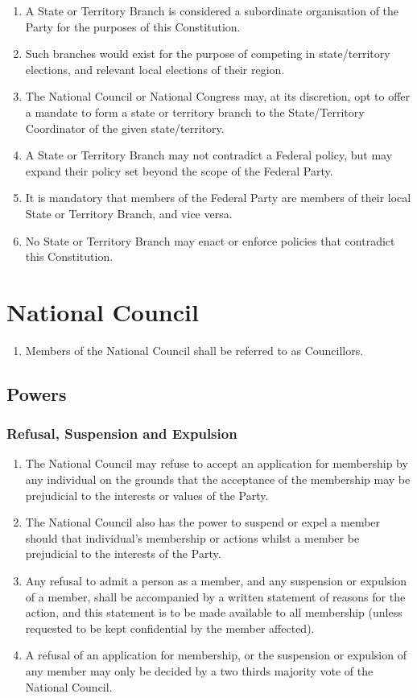 \documentclass[a4paper,titlepage,8.5pt]{article}
\begin{document}
\begin{enumerate}
\item A State or Territory Branch is considered a subordinate organisation of the Party for the purposes of this Constitution.
\item Such branches would exist for the purpose of competing in state/territory elections, and relevant local elections of their region.
\item The National Council or National Congress may, at its discretion, opt to offer a mandate to form a state or territory branch to the State/Territory Coordinator of the given state/territory.
\item A State or Territory Branch may not contradict a Federal policy, but may expand their policy set beyond the scope of the Federal Party.
\item It is mandatory that members of the Federal Party are members of their local State or Territory Branch, and vice versa.
\item No State or Territory Branch may enact or enforce policies that contradict this Constitution.
\end{enumerate}

\section{National Council}

\begin{enumerate}
\item Members of the National Council shall be referred to as Councillors.
\end{enumerate}

\subsection{Powers}

\subsubsection{Refusal, Suspension and Expulsion}

\begin{enumerate}
\item The National Council may refuse to accept an application for membership by any individual on the grounds that the acceptance of the membership may be prejudicial to the interests or values of the Party.
\item The National Council also has the power to suspend or expel a member should that individual’s membership or actions whilst a member be prejudicial to the interests of the Party.
\item Any refusal to admit a person as a member, and any suspension or expulsion of a member, shall be accompanied by a written statement of reasons for the action, and this statement is to be made available to all membership (unless requested to be kept confidential by the member affected).
\item A refusal of an application for membership, or the suspension or expulsion of any member may only be decided by a two thirds majority vote of the National Council.
\end{enumerate}
\end{document}
